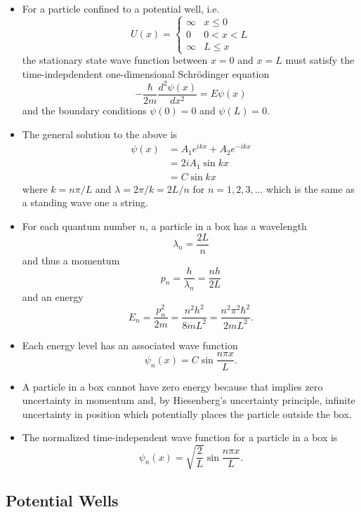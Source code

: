 \documentclass{article}
\begin{document}
\begin{itemize}
  \item For a particle confined to a potential well, i.e. \[U(x) = \begin{cases}
            \infty & x \le 0   \\
            0      & 0 < x < L \\
            \infty & L \le x
          \end{cases}\] the stationary state wave function between $x = 0$ and $x = L$ must satisfy the time-indepdendent one-dimensional Schrödinger equation \[-\frac{\hbar}{2 m} \frac{d^2 \psi(x)}{d x^2} = E \psi(x)\] and the boundary conditions $\psi(0) = 0$ and $\psi(L) = 0$.

  \item The general solution to the above is \begin{align*}
          \psi(x) & = A_1 e^{i k x} + A_2 e^{-i k x} \\
                  & = 2 i A_1 \sin k x               \\
                  & = C \sin k x
        \end{align*} where $k = n \pi / L$ and $\lambda = 2 \pi / k = 2 L / n$ for $n = 1, 2, 3, \ldots$ which is the same as a standing wave one a string.

  \item For each quantum number $n$, a particle in a box has a wavelength \[\lambda_n = \frac{2 L}{n}\] and thus a momentum \[p_n = \frac{h}{\lambda_n} = \frac{n h}{2 L}\] and an energy \[E_n = \frac{p_n^2}{2 m} = \frac{n^2 h^2}{8 m L^2} = \frac{n^2 \pi^2 \hbar^2}{2 m L^2}.\]

  \item Each energy level has an associated wave function \[\psi_n(x) = C \sin \frac{n \pi x}{L}.\]

  \item A particle in a box cannot have zero energy because that implies zero uncertainty in momentum and, by Hiesenberg's uncertainty principle, infinite uncertainty in position which potentially places the particle outside the box.

\item The normalized time-independent wave function for a particle in a box is \[\psi_n(x) = \sqrt{\frac{2}{L}} \sin \frac{n \pi x}{L}.\]
\end{itemize}

\subsection{Potential Wells}
\end{document}
